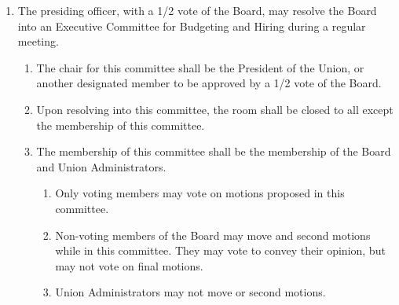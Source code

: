 \begin{enumerate}
\begin{enumerate}
\begin{enumerate}
    \end{enumerate}
  \item It shall promote cohesion between the Executive Board and other Union bodies.
    \begin{enumerate}
    \item It shall be the responsibility of the chairpersons, or designated representative, of each Executive Board committee to correspond with both the ExComm chairperson and the President of the Union on all publicity information.
    \item The Director of Public Relations of the Undergraduate Council, a designee of the Graduate Council, and the chairperson of the Judicial Board may correspond with ExComm and its chairperson if they wish to use the resources and platforms of the committee to promote the information and initiatives of their respective bodies.
    \item The Chair of ExComm and their equivalents on the Student Senate, Judicial Board, Undergraduate Council, and Graduate Council, or a designee if there is no such equivalent, shall meet at least monthly during the academic year to ensure cohesion between different Union bodies in their communications and messaging.
    \end{enumerate}
  \end{enumerate}
\item The presiding officer, with a 1/2 vote of the Board, may resolve the Board into an Executive Committee for Budgeting and Hiring during a regular meeting.
  \begin{enumerate}
  \item The chair for this committee shall be the President of the Union, or another designated member to be approved by a 1/2 vote of the Board.
  \item Upon resolving into this committee, the room shall be closed to all except the membership of this committee.
  \item The membership of this committee shall be the membership of the Board and Union Administrators.
    \begin{enumerate}
    \item Only voting members may vote on motions proposed in this committee.
    \item Non-voting members of the Board may move and second motions while in this committee. They may vote to convey their opinion, but may not vote on final motions.
    \item Union Administrators may not move or second motions.

\end{enumerate}
\end{enumerate}
\end{enumerate}
